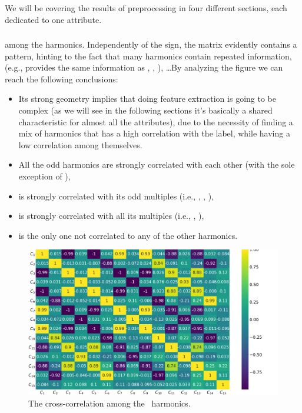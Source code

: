 We will be covering the results of preprocessing in four different sections, each dedicated to one
attribute.

\subsubsection{\an}
 among the harmonics. Independently of the sign, the matrix evidently contains a
pattern, hinting to the fact that many harmonics contain repeated information, (e.g., \an[1] provides
the same information as \an[3], \an[5], \an[7]), \ldots By analyzing the figure we can reach the
following conclusions:
\begin{itemize}
	\item Its strong geometry implies that doing feature extraction is going to be complex (as
	      we will see in the following sections it's basically a shared characteristic for
	      almost all the attributes), due to the necessity of finding a mix of harmonics that has a high correlation with the label, while having a low correlation among themselves.
	\item All the odd harmonics are strongly correlated with each other (with the sole exception
	      of \an[15]),
	\item \an[2] is strongly correlated with its odd multiples (i.e., \an[6], \an[10], \an[14]),
	\item \an[4] is strongly correlated with all its multiples (i.e., \an[8], \an[12]),
	\item \an[15] is the only one not correlated to any of the other harmonics.
\end{itemize}
\begin{figure}[!ht]
	\centering
	\includegraphics[width=\linewidth]{img/An_corr_matrix.png}
	\caption{The cross-correlation among the \an\ harmonics.} \label{fig:an-corr}
\end{figure}

